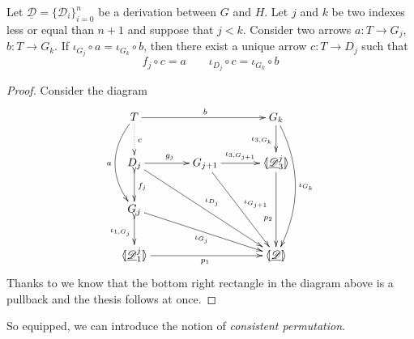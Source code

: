 \documentclass[a4paper,UKenglish,cleveref,pdftex, thm-restate,numberwithinsect]{lipics}
\def\D{\textbf {\textup{D}}}
\newcommand{\dder}[1]{\mathscr{#1}}
\newcommand{\der}[1]{\underline{\dder{#1}}}
\newcommand{\lpro}{\langle \hspace{-1.85pt}[}
\newcommand{\rpro}{]\hspace{-1.85pt}\rangle}
\newcommand{\tpro}[1]{\lpro \der{#1}\rpro}
\begin{document}
\begin{corollary}\label{cor:ele}
	Let $\der{D}=\{\dder{D}_{i}\}_{i=0}^n$ be a derivation between $G$ and $H$. Let $j$ and $k$ be two indexes less or equal than $n+1$ and suppose that $j< k$.  Consider two arrows $a\colon T\to G_j$, $b\colon T\to G_k$. If $\iota_{G_j}\circ a = \iota_{G_k}\circ b$, 
	then  there exist a unique arrow $c\colon T\to D_j $  such that \[f_j\circ c = a\qquad \iota_{D_j}\circ c =\iota_{G_k}\circ b\]
	\end{corollary}
\begin{proof} Consider the diagram
			\[\xymatrix@C=34pt{T  \ar@/_.6cm/[dd]_{a}\ar@{.>}[d]^{c}\ar[rr]^{b}&& G_k \ar[d]_{\iota_{3, G_k}} \ar@/^.6cm/[ddd]^{\iota_{G_k}}\\D_{j} \ar[r]^{g_j} \ar[ddrr]^{\iota_{D_j}}\ar@{>->}[d]^{f_j}& G_{j+1} \ar[r]^-{\iota_{3,G_{j+1}}} \ar[ddr]^{\iota_{G_{j+1}}} & \lpro \der{D}^j_3\rpro \ar[dd]_(.6){p_2} \\ G_j \ar@{>->}[d]_{\iota_{1,G_j}} \ar[drr]_{\iota_{G_j}}\\ \lpro \der{D}^j_1 \rpro \ar[rr]_{p_1}  &&\tpro{D} }\] 
			Thanks to  we know that the bottom right rectangle in the diagram above is a pullback and the thesis follows at once.
\end{proof}	
	
	
So equipped, we can introduce the notion of \emph{consistent permutation}.
\end{document}
